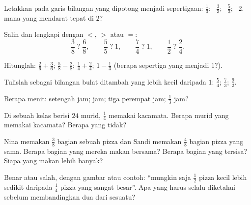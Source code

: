 \begin{exercise}[$\star$]\label{exo:g4:fractions:4}
Letakkan pada garis bilangan yang dipotong menjadi sepertigaan:
$\frac13$; \ $\frac33$; \ $\frac53$; \ $2$.  mana yang mendarat tepat di $2$?
\end{exercise}

\begin{exercise}[$\star$]\label{exo:g4:fractions:5}
Salin dan lengkapi dengan $<$, $>$ atau $=$:
\[
\frac38 \;?\; \frac68, \qquad
\frac55 \;?\; 1, \qquad
\frac74 \;?\; 1, \qquad
\frac12 \;?\; \frac24 .
\]
\end{exercise}

\begin{exercise}[$\star$]\label{exo:g4:fractions:6}
Hitunglah: $\frac26 + \frac36$; \quad $\frac58 - \frac28$; \quad
$\frac14 + \frac24$; \quad $1 - \frac13$ (berapa sepertiga yang
menjadi $1$?).
\end{exercise}

\begin{exercise}[$\star$]\label{exo:g4:fractions:7}
Tulislah sebagai bilangan bulat ditambah  yang lebih kecil
daripada $1$: $\frac54$; \quad $\frac73$; \quad $\frac{9}{2}$.
\end{exercise}

\begin{exercise}[$\star$]\label{exo:g4:fractions:8}
Berapa menit: setengah jam;  jam; tiga perempat jam;
$\frac13$ jam?
\end{exercise}

\begin{exercise}[$\star$]\label{exo:g4:fractions:9}
Di sebuah kelas berisi $24$ murid, $\frac14$ memakai kacamata.
Berapa murid yang memakai kacamata? Berapa yang tidak?
\end{exercise}

\begin{exercise}[$\star\star$]\label{exo:g4:fractions:10}
Nina memakan $\frac38$ bagian sebuah pizza dan Sandi memakan
$\frac48$ bagian pizza yang sama. Berapa bagian yang mereka makan
bersama? Berapa bagian yang tersisa? Siapa yang makan lebih banyak?
\end{exercise}

\begin{exercise}[$\star\star$]\label{exo:g4:fractions:11}
Benar atau salah, dengan gambar atau contoh: ``mungkin saja
$\frac12$ pizza kecil lebih sedikit daripada $\frac14$ pizza yang
sangat besar''. Apa yang harus selalu diketahui sebelum
membandingkan dua  dari sesuatu?

\end{exercise}
